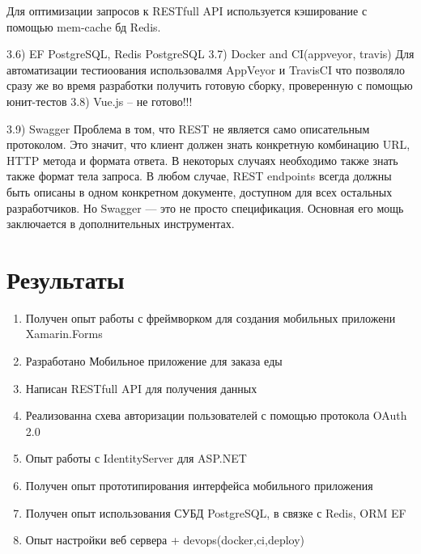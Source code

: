 \documentclass[14pt]{matmex-diploma-custom}
\begin{document}
    Для оптимизации запросов к RESTfull API используется кэширование с помощью mem-cache бд Redis\cite{redis_dotnet_doc}.

    3.6) EF PostgreSQL, Redis
    PostgreSQL
    3.7) Docker and CI(appveyor, travis)
        Для автоматизации тестиоования использовалмя AppVeyor и TravisCI что позволяло сразу же во время разработки получить готовую сборку, проверенную с помощью юнит-тестов
    3.8) Vue.js -- не готово!!!
    
    3.9) Swagger
    Проблема в том, что REST не является само описательным протоколом.
    Это значит, что клиент должен знать конкретную комбинацию URL, HTTP метода и формата ответа.
    В некоторых случаях необходимо также знать также формат тела запроса.
    В любом случае, REST endpoints всегда должны быть описаны в одном конкретном документе, доступном для всех остальных разработчиков.
    Но Swagger — это не просто спецификация. Основная его мощь заключается в дополнительных инструментах.
\section{Результаты}

\begin{enumerate}
    \item Получен опыт работы с фреймворком для создания мобильных приложени Xamarin.Forms
    \item Разработано Мобильное приложение для заказа еды
    \item Написан RESTfull API для получения данных
    \item Реализованна схева авторизации пользователей с помощью протокола OAuth 2.0
    \item Опыт работы с IdentityServer для ASP.NET
    \item Получен опыт прототипирования интерфейса мобильного приложения
    \item Получен опыт использования СУБД PostgreSQL, в связке с Redis, ORM EF
    \item Опыт настройки веб сервера + devops(docker,ci,deploy)
\end{enumerate}

\nocite{*}


\end{document}
